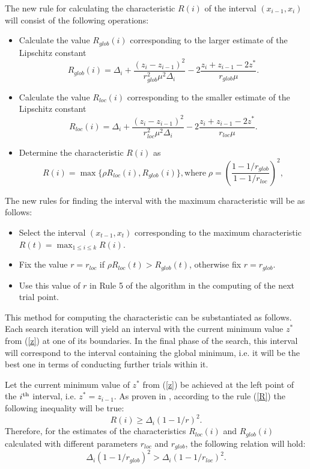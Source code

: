 \documentclass[runningheads]{llncs}
\begin{document}
The new rule for calculating the characteristic $R(i)$ of the interval $(x_{i-1}, x_i)$ will consist of the following operations:
\begin{itemize}
\item
Calculate the value $R_{glob}(i)$ corresponding to the larger estimate of the Lipschitz constant
\[
R_{glob}(i)=\Delta_i+\frac{(z_i-z_{i-1})^2}{r_{glob}^2\mu^2\Delta_i}-2\frac{z_i+z_{i-1}-2z^*}{r_{glob}\mu}.
\]
\item
Calculate the value $R_{loc}(i)$ corresponding to the smaller estimate of the Lipschitz constant
\[
R_{loc}(i)=\Delta_i+\frac{(z_i-z_{i-1})^2}{r_{loc}^2\mu^2\Delta_i}-2\frac{z_i+z_{i-1}-2z^*}{r_{loc}\mu}.
\]
\item
Determine the characteristic $R(i)$ as
\begin{equation}\label{pho}
R(i) = \max\{\rho R_{loc}(i),R_{glob}(i)\}, \textrm{where} \; \rho = \left(\frac{1-1/r_{glob}}{1-1/r_{loc}}\right)^2,
\end{equation}   
\end{itemize}

The new rules for finding the interval with the maximum characteristic will be as follows:
\begin{itemize}
\item 
Select the interval $(x_{t-1},x_t)$ corresponding to the maximum characteristic $R(t)= \max_{1 \leq i \leq k}R(i)$.
\item
Fix the value $r = r_{loc}$ if $\rho R_{loc}(t) > R_{glob}(t)$, otherwise fix $r=r_{glob}$.
\item
Use this value of $r$ in Rule 5 of the algorithm in the computing of the next trial point.
\end{itemize}


This method for computing the characteristic can be substantiated as follows. 
Each search iteration will yield an interval with the current minimum value $z^*$ from (\ref{z}) at one of its boundaries. In the final phase of the search, this interval will correspond to the interval containing the global minimum, i.e. it will be the best one in terms of conducting further trials within it.

Let the current minimum value of $z^*$ from (\ref{z}) be achieved at the left point of the $i^{\rm th}$ interval, i.e. $z^* = z_{i-1}$. 
As proven in \cite{Strongin2000}, according to the rule (\ref{R}) the following inequality will be true: 
\[
R(i) \geq \Delta_i \left( 1 - 1/r \right)^2.
\]
Therefore, for the estimates of the characteristics $R_{loc}(i)$ and $R_{glob}(i)$ calculated with different parameters $r_{loc}$ and $r_{glob}$, the following relation will hold:
\[
	\Delta_i \left( 1 - 1/r_{glob} \right)^2 > \Delta_i \left( 1 - 1/r_{loc} \right)^2.
\]
\end{document}
